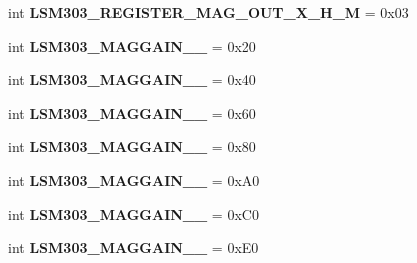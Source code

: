 \begin{DoxyCompactItemize}
\item 
\hypertarget{classdriver_1_1DRIVER__CORE_1_1Adafruit__LSM303_a39399d95adf47130963ad6228b41f5b5}{}int {\bfseries L\+S\+M303\+\_\+\+R\+E\+G\+I\+S\+T\+E\+R\+\_\+\+M\+A\+G\+\_\+\+O\+U\+T\+\_\+\+X\+\_\+\+H\+\_\+\+M} = 0x03\label{classdriver_1_1DRIVER__CORE_1_1Adafruit__LSM303_a39399d95adf47130963ad6228b41f5b5}

\item 
\hypertarget{classdriver_1_1DRIVER__CORE_1_1Adafruit__LSM303_a7f838baa79a6ae3da80e428f07c0b9ae}{}int {\bfseries L\+S\+M303\+\_\+\+M\+A\+G\+G\+A\+I\+N\+\_\+\_} = 0x20\label{classdriver_1_1DRIVER__CORE_1_1Adafruit__LSM303_a7f838baa79a6ae3da80e428f07c0b9ae}

\item 
\hypertarget{classdriver_1_1DRIVER__CORE_1_1Adafruit__LSM303_a895624eb31381290c41eb4ba15762a21}{}int {\bfseries L\+S\+M303\+\_\+\+M\+A\+G\+G\+A\+I\+N\+\_\+\_} = 0x40\label{classdriver_1_1DRIVER__CORE_1_1Adafruit__LSM303_a895624eb31381290c41eb4ba15762a21}

\item 
\hypertarget{classdriver_1_1DRIVER__CORE_1_1Adafruit__LSM303_a690a2ccf1305ddb8e369e42e140a3d9e}{}int {\bfseries L\+S\+M303\+\_\+\+M\+A\+G\+G\+A\+I\+N\+\_\+\_} = 0x60\label{classdriver_1_1DRIVER__CORE_1_1Adafruit__LSM303_a690a2ccf1305ddb8e369e42e140a3d9e}

\item 
\hypertarget{classdriver_1_1DRIVER__CORE_1_1Adafruit__LSM303_aabf347d0927ecaea47e318cc804e10a0}{}int {\bfseries L\+S\+M303\+\_\+\+M\+A\+G\+G\+A\+I\+N\+\_\+\_} = 0x80\label{classdriver_1_1DRIVER__CORE_1_1Adafruit__LSM303_aabf347d0927ecaea47e318cc804e10a0}

\item 
\hypertarget{classdriver_1_1DRIVER__CORE_1_1Adafruit__LSM303_a1875f919180b6da6408c2d005bb8bdad}{}int {\bfseries L\+S\+M303\+\_\+\+M\+A\+G\+G\+A\+I\+N\+\_\+\_} = 0x\+A0\label{classdriver_1_1DRIVER__CORE_1_1Adafruit__LSM303_a1875f919180b6da6408c2d005bb8bdad}

\item 
\hypertarget{classdriver_1_1DRIVER__CORE_1_1Adafruit__LSM303_a9dfa52c66b43d044d18e642243a4c15d}{}int {\bfseries L\+S\+M303\+\_\+\+M\+A\+G\+G\+A\+I\+N\+\_\+\_} = 0x\+C0\label{classdriver_1_1DRIVER__CORE_1_1Adafruit__LSM303_a9dfa52c66b43d044d18e642243a4c15d}

\item 
\hypertarget{classdriver_1_1DRIVER__CORE_1_1Adafruit__LSM303_a4c33c59d6577266becd976da47b46e7c}{}int {\bfseries L\+S\+M303\+\_\+\+M\+A\+G\+G\+A\+I\+N\+\_\+\_} = 0x\+E0\label{classdriver_1_1DRIVER__CORE_1_1Adafruit__LSM303_a4c33c59d6577266becd976da47b46e7c}

\end{DoxyCompactItemize}


